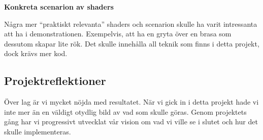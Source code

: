 \documentclass[a4paper]{article}
\begin{document}
\begin{multicols}{2}
            \textbf{Konkreta scenarion av shaders}

            Några mer ``praktiskt relevanta'' shaders och scenarion skulle ha varit intressanta att ha i demonstrationen. Exempelvis, att ha en gryta över en brasa som dessutom skapar lite rök. Det skulle innehålla all teknik som finns i detta projekt, dock krävs mer kod.

        \subsection{Projektreflektioner}

            Över lag är vi mycket nöjda med resultatet. När vi gick in i detta projekt hade vi inte mer än en väldigt otydlig bild av vad som skulle göras. Genom projektets gång har vi progressivt utvecklat vår vision om vad vi ville se i slutet och hur det skulle implementeras.

    \nocite{*} %
    
    
\end{multicols}
\end{document}
